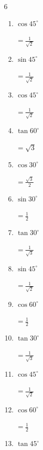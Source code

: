 \begin{multicols}{6}
\begin{enumerate}
        $\displaystyle =1$

  \item $\displaystyle \cos{45^\circ}$

        $\displaystyle =\frac{1}{\sqrt{2}}$

  \item $\displaystyle \sin{45^\circ}$

        $\displaystyle =\frac{1}{\sqrt{2}}$

  \item $\displaystyle \cos{45^\circ}$

        $\displaystyle =\frac{1}{\sqrt{2}}$

  \item $\displaystyle \tan{60^\circ}$

        $\displaystyle =\sqrt{3}$

  \item $\displaystyle \cos{30^\circ}$

        $\displaystyle =\frac{\sqrt{3}}{2}$

  \item $\displaystyle \sin{30^\circ}$

        $\displaystyle =\frac{1}{2}$

  \item $\displaystyle \tan{30^\circ}$

        $\displaystyle =\frac{1}{\sqrt{3}}$

  \item $\displaystyle \sin{45^\circ}$

        $\displaystyle =\frac{1}{\sqrt{2}}$

  \item $\displaystyle \cos{60^\circ}$

        $\displaystyle =\frac{1}{2}$

  \item $\displaystyle \tan{30^\circ}$

        $\displaystyle =\frac{1}{\sqrt{3}}$

  \item $\displaystyle \cos{45^\circ}$

        $\displaystyle =\frac{1}{\sqrt{2}}$

  \item $\displaystyle \cos{60^\circ}$

        $\displaystyle =\frac{1}{2}$

\columnbreak %

  \item $\displaystyle \tan{45^\circ}$


\end{enumerate}
\end{multicols}

